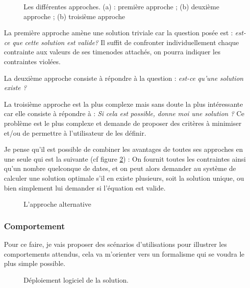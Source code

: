 \begin{figure}[ht]
    \centering
    \caption{Les différentes approches. (a) : première approche ; (b) deuxième approche ; (b) troisième approche \label{figPackages}}
\end{figure}

La première approche amène une solution triviale car la question posée est : \emph{est-ce que cette solution est valide?} Il suffit de confronter individuellement chaque contrainte aux valeurs de ses timenodes attachés, on pourra indiquer les contraintes violées.

La deuxième approche consiste à répondre à la question : \emph{est-ce qu'une solution existe ?}

La troisième approche est la plus complexe mais sans doute la plus intéressante car elle consiste à répondre à : \emph{Si cela est possible, donne moi une solution ?} Ce problème est le plus complexe et demande de proposer des critères à minimiser et/ou de permettre à l'utilisateur de les définir. 

Je pense qu'il est possible de combiner les avantages de toutes ses approches en une seule qui est la suivante (cf figure \ref{figPackages2}) :
On fournit toutes les contraintes ainsi qu'un nombre quelconque de dates, et on peut alors demander au système de calculer une solution optimale s'il en existe plusieurs, soit la solution unique, ou bien simplement lui demander si l'équation est valide.

\begin{figure}[ht]
    \centering
    \caption{L'approche alternative \label{figPackages2}}
\end{figure}

\subsubsection{Comportement}


Pour ce faire, je vais proposer des scénarios d'utilisations pour illustrer les comportements attendus, cela va m'orienter vers un formalisme qui se voudra le plus simple possible.

\begin{figure}[ht]
    \centering
    \caption{ Déploiement logiciel de la solution.\label{figDeploiement}}
\end{figure}


